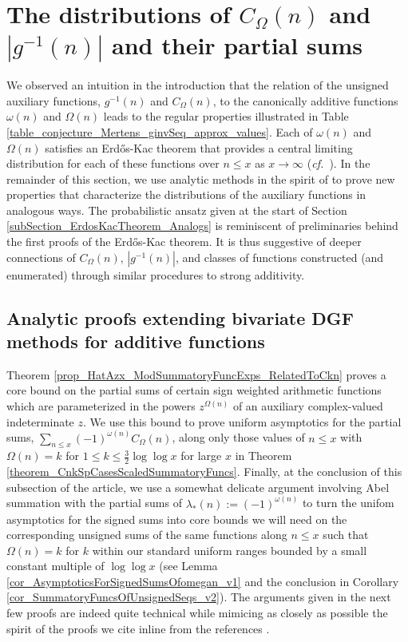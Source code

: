 \documentclass[11pt,reqno,a4letter]{article}
\numberwithin{figure}{section}
\numberwithin{table}{section}
\newcommand{\cf}{\textit{cf.\ }}
\theoremstyle{plain}
\numberwithin{theorem}{section}
\theoremstyle{definition}
\begin{document}
\section{The distributions of $C_{\Omega}(n)$ and $|g^{-1}(n)|$ and their partial sums} 
\label{Section_NewFormulasForgInvn} 

We observed an intuition in the introduction that the relation of the unsigned auxiliary 
functions, $g^{-1}(n)$ and $C_{\Omega}(n)$, to the canonically additive functions 
$\omega(n)$ and $\Omega(n)$ leads to the regular properties 
illustrated in Table \ref{table_conjecture_Mertens_ginvSeq_approx_values}. 
Each of $\omega(n)$ and $\Omega(n)$ satisfies 
an Erd\H{o}s-Kac theorem that provides a central limiting 
distribution for each of these functions over 
$n \leq x$ as $x \rightarrow \infty$ 
\cite{ERDOS-KAC-REF,BILLINGSLY-CLT-PRIMEDIVFUNC,RENYI-TURAN} 
(\cf \cite{CLT-RANDOM-ORDERED-FACTS-2011}). 
In the remainder of this section, we use analytic methods in the spirit of 
\cite[\S 7.4]{MV} to prove new properties that characterize the distributions of the 
auxiliary functions in analogous ways. 
The probabilistic ansatz given at the start of 
Section \ref{subSection_ErdosKacTheorem_Analogs} 
is reminiscent of preliminaries behind the first proofs of the Erd\H{os}-Kac theorem. 
It is thus suggestive of deeper connections of $C_{\Omega}(n)$, $|g^{-1}(n)|$, 
and classes of functions constructed (and enumerated) through 
similar procedures to strong additivity. 

\subsection{Analytic proofs extending bivariate DGF methods for additive functions} 
\label{subSection_Section4_AnalyticPrerequisiteProofsOfUniformBoundsOnCertainPartialSumTypes_v1} 

Theorem \ref{prop_HatAzx_ModSummatoryFuncExps_RelatedToCkn} 
proves a core bound on the partial sums of certain sign weighted arithmetic 
functions which are parameterized in the powers $z^{\Omega(n)}$ of an auxiliary complex-valued 
indeterminate $z$. 
We use this bound to prove uniform asymptotics for the partial sums, 
$\sum_{n \leq x} (-1)^{\omega(n)} C_{\Omega}(n)$, along only those values of $n \leq x$ with 
$\Omega(n) = k$ for $1 \leq k \leq \frac{3}{2}\log\log x$ for large $x$ in 
Theorem \ref{theorem_CnkSpCasesScaledSummatoryFuncs}. 
Finally, at the conclusion of this subsection of the article, we use a somewhat delicate argument 
involving Abel summation with the partial sums of $\lambda_{\ast}(n) := (-1)^{\omega(n)}$ to 
turn the unifom asymptotics for the signed sums into core bounds we will need on the 
corresponding unsigned sums of the same functions along $n \leq x$ such that 
$\Omega(n) = k$ for $k$ within our standard uniform ranges bounded by a 
small constant multiple of $\log\log x$ 
(see Lemma \ref{cor_AsymptoticsForSignedSumsOfomegan_v1} and the conclusion in 
Corollary \ref{cor_SummatoryFuncsOfUnsignedSeqs_v2}). 
The arguments given in the next few proofs are indeed quite 
technical while mimicing as closely as possible the 
spirit of the proofs we cite inline from the references \cite{MV,TENENBAUM-PROBNUMT-METHODS}. 
\end{document}
